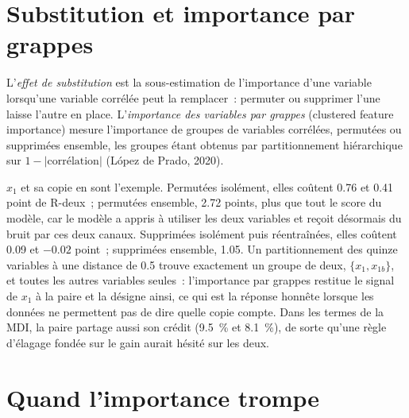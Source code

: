 \section{Substitution et importance par grappes}

\begin{definition}\label{def:ml:feature-engineering-selection-and-importance:substitution}
L'\emph{effet de substitution} est la sous-estimation de l'importance d'une variable lorsqu'une variable corrélée peut la remplacer~:
permuter ou supprimer l'une laisse l'autre en place. L'\emph{importance des variables
par grappes} (clustered feature importance) mesure l'importance de groupes de variables corrélées, permutées ou
supprimées ensemble, les groupes étant obtenus par partitionnement hiérarchique sur $1 - |\text{corrélation}|$ (López de Prado, 2020).
\end{definition}

$x_1$ et sa copie en sont l'exemple. Permutées isolément, elles coûtent 0.76 et 0.41 point de R-deux~; permutées ensemble, 2.72
points, plus que tout le score du modèle, car le modèle a appris à utiliser les deux variables et reçoit désormais du bruit par ces deux canaux.
Supprimées isolément puis réentraînées, elles coûtent 0.09 et $-0.02$ point~; supprimées ensemble, 1.05. Un partitionnement des quinze variables
à une distance de 0.5 trouve exactement un groupe de deux, $\{x_1, x_{1b}\}$, et toutes les autres variables seules~: l'importance par grappes
restitue le signal de $x_1$ à la paire et la désigne ainsi, ce qui est la réponse honnête lorsque les données ne permettent pas de dire
quelle copie compte. Dans les termes de la MDI, la paire partage aussi son crédit (9.5~\% et 8.1~\%), de sorte qu'une règle d'élagage fondée sur le gain aurait hésité
sur les deux.

\section{Quand l'importance trompe}


